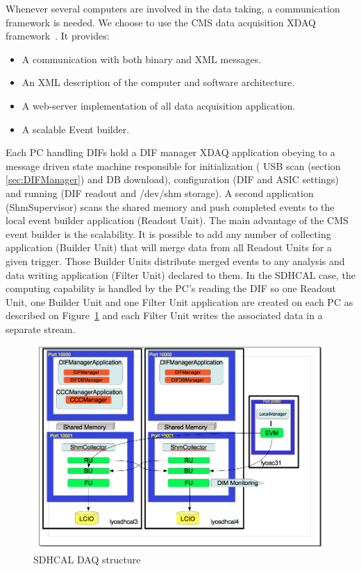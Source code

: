 \documentclass[english]{article}
\begin{document}
Whenever several computers are involved in the data taking, a communication
framework is needed. We choose to use the CMS data acquisition XDAQ
framework~\cite{Xdaq}. It provides:
\begin{itemize}
\item A communication with both binary and XML messages.
\item An XML description of the computer and software architecture.
\item A web-server implementation of all data acquisition application.
\item A scalable Event builder.
\end{itemize}
Each PC handling DIFs hold a DIF manager XDAQ application obeying
to a message driven state machine responsible for initialization (
USB scan (section \ref{sec:DIFManager}) and DB download), configuration (DIF and ASIC settings)
and running (DIF readout and /dev/shm storage). A second application
(ShmSupervisor) scans the shared memory and push completed events
to the local event builder application (Readout Unit). The main advantage
of the CMS event builder is the scalability. It is possible to add
any number of collecting application (Builder Unit) that will merge
data from all Readout Units for a given trigger. Those Builder Units
distribute merged events to any analysis and data writing application
(Filter Unit) declared to them. In the SDHCAL case, the computing capability
is handled by the PC's reading the DIF so one Readout Unit, one Builder
Unit and one Filter Unit application are created on each PC as described
on Figure~\ref{SDHCALDAQStructure} and each Filter Unit writes the associated data in a separate stream. 

\begin{figure}
\centerline{\includegraphics[clip,width=0.85\paperwidth,height=0.4\textheight,keepaspectratio]{./SDHCAL_DAQ_Schema.png}}
\caption{SDHCAL DAQ structure}
\label{SDHCALDAQStructure}
\end{figure}
\end{document}
